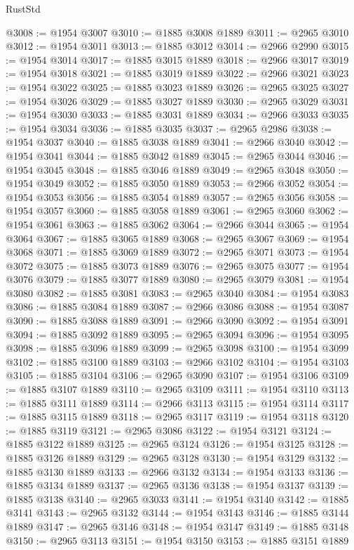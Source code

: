 \begin{lexlean}{RustStd}
\begin{coremodule}
{\begin{coremodule}
{{{{{{{{{{{{{{{{{{{{{{{{{{{{{@3008 := @1954 @3007
@3010 := @1885 @3008 @1889
@3011 := @2965 @3010
@3012 := @1954 @3011
@3013 := @1885 @3012
@3014 := @2966 @2990
@3015 := @1954 @3014
@3017 := @1885 @3015 @1889
@3018 := @2966 @3017
@3019 := @1954 @3018
@3021 := @1885 @3019 @1889
@3022 := @2966 @3021
@3023 := @1954 @3022
@3025 := @1885 @3023 @1889
@3026 := @2965 @3025
@3027 := @1954 @3026
@3029 := @1885 @3027 @1889
@3030 := @2965 @3029
@3031 := @1954 @3030
@3033 := @1885 @3031 @1889
@3034 := @2966 @3033
@3035 := @1954 @3034
@3036 := @1885 @3035
@3037 := @2965 @2986
@3038 := @1954 @3037
@3040 := @1885 @3038 @1889
@3041 := @2966 @3040
@3042 := @1954 @3041
@3044 := @1885 @3042 @1889
@3045 := @2965 @3044
@3046 := @1954 @3045
@3048 := @1885 @3046 @1889
@3049 := @2965 @3048
@3050 := @1954 @3049
@3052 := @1885 @3050 @1889
@3053 := @2966 @3052
@3054 := @1954 @3053
@3056 := @1885 @3054 @1889
@3057 := @2965 @3056
@3058 := @1954 @3057
@3060 := @1885 @3058 @1889
@3061 := @2965 @3060
@3062 := @1954 @3061
@3063 := @1885 @3062
@3064 := @2966 @3044
@3065 := @1954 @3064
@3067 := @1885 @3065 @1889
@3068 := @2965 @3067
@3069 := @1954 @3068
@3071 := @1885 @3069 @1889
@3072 := @2965 @3071
@3073 := @1954 @3072
@3075 := @1885 @3073 @1889
@3076 := @2965 @3075
@3077 := @1954 @3076
@3079 := @1885 @3077 @1889
@3080 := @2965 @3079
@3081 := @1954 @3080
@3082 := @1885 @3081
@3083 := @2965 @3040
@3084 := @1954 @3083
@3086 := @1885 @3084 @1889
@3087 := @2966 @3086
@3088 := @1954 @3087
@3090 := @1885 @3088 @1889
@3091 := @2966 @3090
@3092 := @1954 @3091
@3094 := @1885 @3092 @1889
@3095 := @2965 @3094
@3096 := @1954 @3095
@3098 := @1885 @3096 @1889
@3099 := @2965 @3098
@3100 := @1954 @3099
@3102 := @1885 @3100 @1889
@3103 := @2966 @3102
@3104 := @1954 @3103
@3105 := @1885 @3104
@3106 := @2965 @3090
@3107 := @1954 @3106
@3109 := @1885 @3107 @1889
@3110 := @2965 @3109
@3111 := @1954 @3110
@3113 := @1885 @3111 @1889
@3114 := @2966 @3113
@3115 := @1954 @3114
@3117 := @1885 @3115 @1889
@3118 := @2965 @3117
@3119 := @1954 @3118
@3120 := @1885 @3119
@3121 := @2965 @3086
@3122 := @1954 @3121
@3124 := @1885 @3122 @1889
@3125 := @2965 @3124
@3126 := @1954 @3125
@3128 := @1885 @3126 @1889
@3129 := @2965 @3128
@3130 := @1954 @3129
@3132 := @1885 @3130 @1889
@3133 := @2966 @3132
@3134 := @1954 @3133
@3136 := @1885 @3134 @1889
@3137 := @2965 @3136
@3138 := @1954 @3137
@3139 := @1885 @3138
@3140 := @2965 @3033
@3141 := @1954 @3140
@3142 := @1885 @3141
@3143 := @2965 @3132
@3144 := @1954 @3143
@3146 := @1885 @3144 @1889
@3147 := @2965 @3146
@3148 := @1954 @3147
@3149 := @1885 @3148
@3150 := @2965 @3113
@3151 := @1954 @3150
@3153 := @1885 @3151 @1889
}}}}}}}}}}}}}}}}}}}}}}}}}}}}}
\end{coremodule}}
\end{coremodule}
\end{lexlean}
